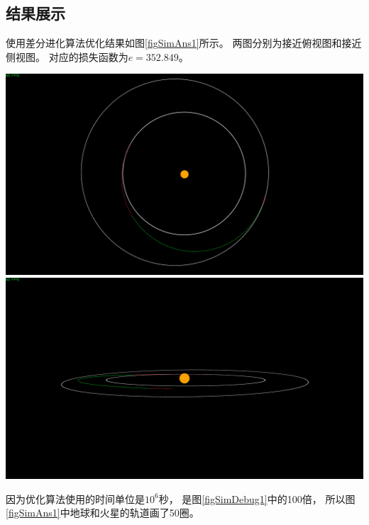 \subsection{结果展示}
使用差分进化算法优化结果如图\ref{figSimAns1}所示。
两图分别为接近俯视图和接近侧视图。
对应的损失函数为$e=352.849$。
\begin{center}
	\includegraphics[scale=0.2]{simans1.png}  \\
	\includegraphics[scale=0.2]{simans2.png}  \\
	\label{figSimAns1}
\end{center}
因为优化算法使用的时间单位是$10^6$秒，
是图\ref{figSimDebug1}中的100倍，
所以图\ref{figSimAns1}中地球和火星的轨道画了50圈。


